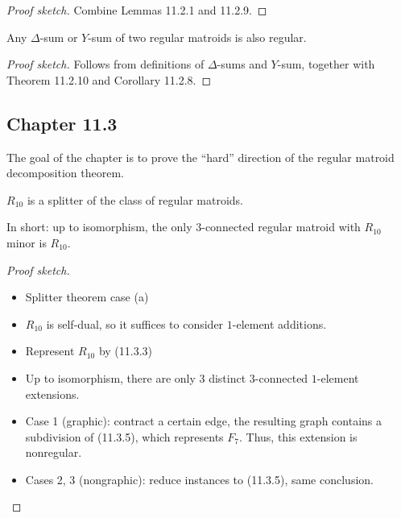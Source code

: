 \begin{proof}[Proof sketch]
  Combine Lemmas 11.2.1 and 11.2.9.
\end{proof}

\begin{corollary}[11.2.12]
  \label{cor:11.2.12}
  Any $\Delta$-sum or $Y$-sum of two regular matroids is also regular.
\end{corollary}

\begin{proof}[Proof sketch]
  Follows from definitions of $\Delta$-sums and $Y$-sum, together with Theorem 11.2.10 and Corollary 11.2.8.
\end{proof}


\subsection{Chapter 11.3}

The goal of the chapter is to prove the ``hard'' direction of the regular matroid decomposition theorem.

\begin{theorem}[11.3.2]
  \label{thm:11.3.2}
  $R_{10}$ is a splitter of the class of regular matroids.

  In short: up to isomorphism, the only $3$-connected regular matroid with $R_{10}$ minor is $R_{10}$.
\end{theorem}

\begin{proof}[Proof sketch]
  \begin{itemize}
    \item Splitter theorem case (a)
    \item $R_{10}$ is self-dual, so it suffices to consider $1$-element additions.
    \item Represent $R_{10}$ by (11.3.3)
    \item Up to isomorphism, there are only $3$ distinct $3$-connected $1$-element extensions.
    \item Case 1 (graphic): contract a certain edge, the resulting graph contains a subdivision of (11.3.5), which represents $F_{7}$. Thus, this extension is nonregular.
    \item Cases 2, 3 (nongraphic): reduce instances to (11.3.5), same conclusion.
  \end{itemize}
\end{proof}

